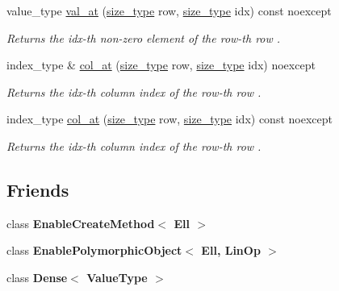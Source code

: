 \begin{DoxyCompactItemize}
value\+\_\+type \hyperlink{classgko_1_1matrix_1_1Ell_a3591fa0ab2ec09b43a15b0f0649d8ea3}{val\+\_\+at} (\hyperlink{namespacegko_a6e5c95df0ae4e47aab2f604a22d98ee7}{size\+\_\+type} row, \hyperlink{namespacegko_a6e5c95df0ae4e47aab2f604a22d98ee7}{size\+\_\+type} idx) const noexcept
\begin{DoxyCompactList}\small\item\em Returns the {\ttfamily idx}-\/th non-\/zero element of the {\ttfamily row}-\/th row . \end{DoxyCompactList}\item 
index\+\_\+type \& \hyperlink{classgko_1_1matrix_1_1Ell_a1ef17227a6de85a1c12ebc106abbfc32}{col\+\_\+at} (\hyperlink{namespacegko_a6e5c95df0ae4e47aab2f604a22d98ee7}{size\+\_\+type} row, \hyperlink{namespacegko_a6e5c95df0ae4e47aab2f604a22d98ee7}{size\+\_\+type} idx) noexcept
\begin{DoxyCompactList}\small\item\em Returns the {\ttfamily idx}-\/th column index of the {\ttfamily row}-\/th row . \end{DoxyCompactList}\item 
index\+\_\+type \hyperlink{classgko_1_1matrix_1_1Ell_a1ac1702011ead4e56857de130b4a5301}{col\+\_\+at} (\hyperlink{namespacegko_a6e5c95df0ae4e47aab2f604a22d98ee7}{size\+\_\+type} row, \hyperlink{namespacegko_a6e5c95df0ae4e47aab2f604a22d98ee7}{size\+\_\+type} idx) const noexcept
\begin{DoxyCompactList}\small\item\em Returns the {\ttfamily idx}-\/th column index of the {\ttfamily row}-\/th row . \end{DoxyCompactList}\end{DoxyCompactItemize}
\subsection*{Friends}
\begin{DoxyCompactItemize}
\item 
\mbox{\label{classgko_1_1matrix_1_1Ell_aff1f69cf59ce70d0ad4ccd5fc854c616}} 
class {\bfseries Enable\+Create\+Method$<$ Ell $>$}
\item 
\mbox{\label{classgko_1_1matrix_1_1Ell_a71537fa3276ed9af486b2167b456f511}} 
class {\bfseries Enable\+Polymorphic\+Object$<$ Ell, Lin\+Op $>$}
\item 
\mbox{\label{classgko_1_1matrix_1_1Ell_a22a84c8f67f946aa60a2fa8bf5835a32}} 
class {\bfseries Dense$<$ Value\+Type $>$}
\end{DoxyCompactItemize}
